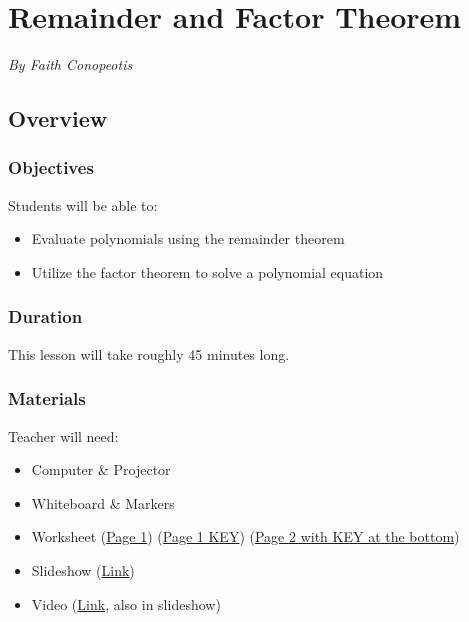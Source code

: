 \chapter{Remainder and Factor Theorem}

\emph{By Faith Conopeotis}

\section{Overview}

\subsection{Objectives}

Students will be able to:
\begin{itemize}
    \item Evaluate polynomials using the remainder theorem
    \item Utilize the factor theorem to solve a polynomial equation
\end{itemize}

\subsection{Duration}

This lesson will take roughly 45 minutes long.

\subsection{Materials}

Teacher will need:
\begin{itemize}
    \item Computer \& Projector
    \item Whiteboard \& Markers
    \item Worksheet (\href{https://drive.google.com/file/d/1crXwcymstVJxKvmbOWzUk5PI2Api0fNN/view?usp=sharing}{Page 1}) (\href{https://drive.google.com/file/d/1tynle8oNpN0HsN0GIBhGMZQ-xCCrXfoI/view?usp=sharing}{Page 1 KEY}) (\href{https://drive.google.com/file/d/1uWLIYOQuwUsIJVg4Sb2ZV4Kpk6U4Bh_h/view?usp=sharing}{Page 2 with KEY at the bottom})
    \item Slideshow (\href{https://docs.google.com/presentation/d/1H6u-uzQyJrKwW_j5G5LfLVYLoSvyrSMNbyg5xnXpMx0/edit?usp=sharing}{Link})
    \item Video (\href{https://youtu.be/_IPqCaspZOs}{Link}, also in slideshow)
\end{itemize}

